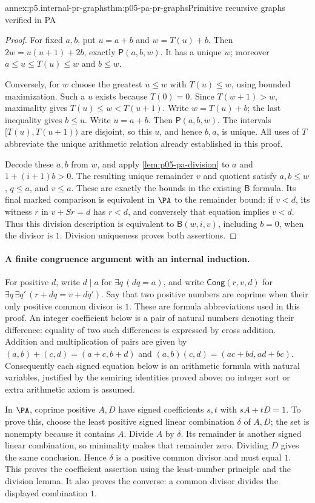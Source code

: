 \begin{annexitem}{annex:p5.internal-pr-graphs}{thm:p05-pa-pr-graphs}{Primitive recursive graphs verified in PA}
\begin{proof}
For fixed \(a,b\), put \(u=a+b\) and \(w=T(u)+b\).
Then \(2w=u(u+1)+2b\), exactly \(\mathsf P(a,b,w)\).
It has a unique \(w\); moreover \(a\leq u\leq T(u)\leq w\)
and \(b\leq w\).

Conversely, for \(w\) choose the greatest \(u\leq w\) with
\(T(u)\leq w\), using bounded maximization.  Such a \(u\) exists
because \(T(0)=0\).  Since \(T(w+1)>w\), maximality gives
\(T(u)\leq w<T(u+1)\).  Write \(w=T(u)+b\); the last inequality
gives \(b\leq u\).  Write \(u=a+b\).  Then
\(\mathsf P(a,b,w)\).  The intervals
\([T(u),T(u+1))\) are disjoint, so this \(u\), and hence \(b,a\),
is unique.  All uses of \(T\) abbreviate the unique arithmetic relation
already established in this proof.

Decode these \(a,b\) from \(w\), and apply
\cref{lem:p05-pa-division} to \(a\) and \(1+(i+1)b>0\).
The resulting unique remainder \(v\) and quotient satisfy
\(a,b\leq w\), \(q\leq a\), and \(v\leq a\).
These are exactly the bounds in the existing \(\mathsf B\) formula.
Its final marked comparison is equivalent in \(\PA\) to the remainder
bound: if \(v<d\), its witness \(r\) in \(v+Sr=d\) has \(r<d\),
and conversely that equation implies \(v<d\).  Thus this division
description is equivalent to \(\mathsf B(w,i,v)\), including \(b=0\),
when the divisor is \(1\).  Division uniqueness proves both assertions.
\end{proof}

\paragraph{A finite congruence argument with an internal induction.}
For positive \(d\), write \(d\mid a\) for \(\exists q\,(dq=a)\),
and write \(\mathsf{Cong}(r,v,d)\) for
\(\exists q\,\exists q'\,(r+dq=v+dq')\).
Say that two positive numbers are coprime when their only positive common
divisor is \(1\).  These are formula abbreviations used in this proof.
An integer coefficient below is a pair of natural numbers denoting their
difference: equality of two such differences is expressed by cross addition.
Addition and multiplication of pairs are given by
\((a,b)+(c,d)=(a+c,b+d)\) and
\((a,b)(c,d)=(ac+bd,ad+bc)\).  Consequently each signed equation below
is an arithmetic formula with natural variables, justified by the semiring
identities proved above; no integer sort or extra arithmetic axiom is assumed.

In \(\PA\), coprime positive \(A,D\) have signed coefficients
\(s,t\) with \(sA+tD=1\).  To prove this, choose the least positive
signed linear combination \(\delta\) of \(A,D\); the set is nonempty
because it contains \(A\).  Divide \(A\) by \(\delta\).  Its remainder
is another signed linear combination, so minimality makes that remainder
zero.  Dividing \(D\) gives the same conclusion.  Hence \(\delta\)
is a positive common divisor and must equal \(1\).  This proves the
coefficient assertion using the least-number principle and the division
lemma.  It also proves the converse: a common divisor divides the displayed
combination \(1\).


\end{annexitem}
